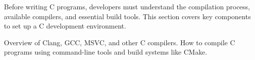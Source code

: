 \begin{NxSBox}
	\begin{NxIDBox}
		Before writing C programs, developers must understand the compilation process, available compilers, and essential build tools. This section covers key components to set up a C development environment.
	\end{NxIDBox}
	\begin{NxIDBoxL}
		 Overview of Clang, GCC, MSVC, and other C compilers.
		 How to compile C programs using command-line tools and build systems like CMake.
	\end{NxIDBoxL}
\end{NxSBox}





%


